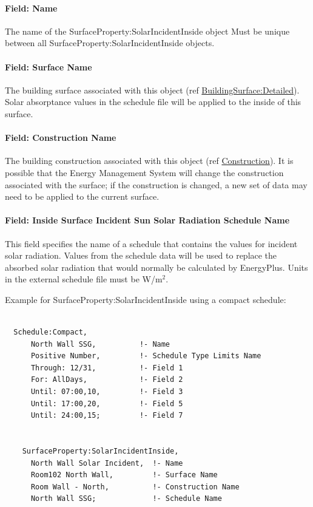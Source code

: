 \paragraph{Field: Name}\label{field-name-10}

The name of the SurfaceProperty:SolarIncidentInside object Must be unique between all SurfaceProperty:SolarIncidentInside objects.

\paragraph{Field: Surface Name}\label{field-surface-name-4}

The building surface associated with this object (ref \hyperref[buildingsurfacedetailed]{BuildingSurface:Detailed}). Solar absorptance values in the schedule file will be applied to the inside of this surface.

\paragraph{Field: Construction Name}\label{field-construction-name-1}

The building construction associated with this object (ref \hyperref[construction-000]{Construction}). It is possible that the Energy Management System will change the construction associated with the surface; if the construction is changed, a new set of data may need to be applied to the current surface.

\paragraph{Field: Inside Surface Incident Sun Solar Radiation Schedule Name}\label{field-inside-surface-incident-sun-solar-radiation-schedule-name}

This field specifies the name of a schedule that contains the values for incident solar radiation. Values from the schedule data will be used to replace the absorbed solar radiation that would normally be calculated by EnergyPlus. Units in the external schedule file must be W/m\(^{2}\).

Example for SurfaceProperty:SolarIncidentInside using a compact schedule:

\begin{lstlisting}

  Schedule:Compact,
      North Wall SSG,          !- Name
      Positive Number,         !- Schedule Type Limits Name
      Through: 12/31,          !- Field 1
      For: AllDays,            !- Field 2
      Until: 07:00,10,         !- Field 3
      Until: 17:00,20,         !- Field 5
      Until: 24:00,15;         !- Field 7


    SurfaceProperty:SolarIncidentInside,
      North Wall Solar Incident,  !- Name
      Room102 North Wall,         !- Surface Name
      Room Wall - North,          !- Construction Name
      North Wall SSG;             !- Schedule Name
\end{lstlisting}

